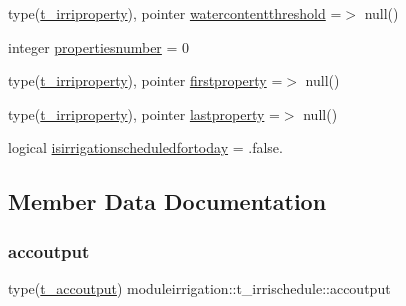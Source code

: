 \begin{DoxyCompactItemize}
type(\mbox{\hyperlink{structmoduleirrigation_1_1t__irriproperty}{t\+\_\+irriproperty}}), pointer \mbox{\hyperlink{structmoduleirrigation_1_1t__irrischedule_a8fc7ed87c81ce448969cdba1c40d2265}{watercontentthreshold}} =$>$ null()
\item 
integer \mbox{\hyperlink{structmoduleirrigation_1_1t__irrischedule_a32eb21eed0e3a30c79a37845f750524d}{propertiesnumber}} = 0
\item 
type(\mbox{\hyperlink{structmoduleirrigation_1_1t__irriproperty}{t\+\_\+irriproperty}}), pointer \mbox{\hyperlink{structmoduleirrigation_1_1t__irrischedule_a0dee7c3e73f6fadc7f91fa4a0926e44c}{firstproperty}} =$>$ null()
\item 
type(\mbox{\hyperlink{structmoduleirrigation_1_1t__irriproperty}{t\+\_\+irriproperty}}), pointer \mbox{\hyperlink{structmoduleirrigation_1_1t__irrischedule_ae9cdebd6278c65bce443149ade7cfb96}{lastproperty}} =$>$ null()
\item 
logical \mbox{\hyperlink{structmoduleirrigation_1_1t__irrischedule_aa4ca2b39cea72efdda612049ae521396}{isirrigationscheduledfortoday}} = .false.
\end{DoxyCompactItemize}


\subsection{Member Data Documentation}
\mbox{\label{structmoduleirrigation_1_1t__irrischedule_a19e83059503e93ea86a22077522d8eb9}} 
\subsubsection{\texorpdfstring{accoutput}{accoutput}}
{\footnotesize\ttfamily type(\mbox{\hyperlink{structmoduleirrigation_1_1t__accoutput}{t\+\_\+accoutput}}) moduleirrigation\+::t\+\_\+irrischedule\+::accoutput\hspace{0.3cm}{\ttfamily [private]}}

\mbox{\label{structmoduleirrigation_1_1t__irrischedule_ad47e02fe26f917b335c533acaaef8d37}} 
